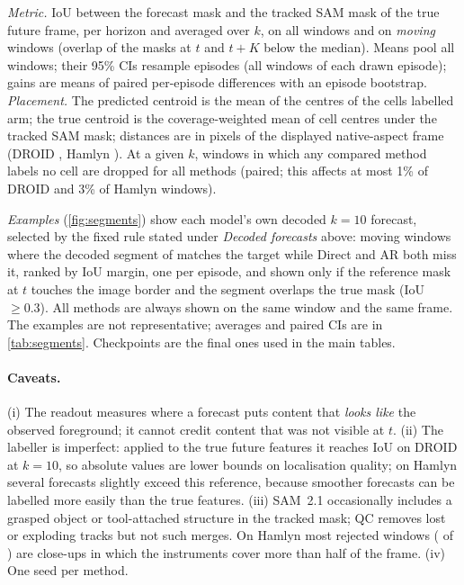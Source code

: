 \emph{Metric.} IoU between the forecast mask and the tracked SAM mask of the true future frame,
per horizon and averaged over $k$, on all windows and on \emph{moving} windows (overlap of the masks at $t$ and $t{+}K$
below the median). Means pool all windows; their 95\% CIs resample episodes (all windows of each drawn episode); gains are means of paired per-episode differences with an episode bootstrap.
\emph{Placement.} The predicted centroid is the mean of the centres of the cells labelled arm; the true centroid is
the coverage-weighted mean of cell centres under the tracked SAM mask; distances are in pixels of the displayed
native-aspect frame (DROID \segDroidPlaceFrame{}, Hamlyn \segHamlynPlaceFrame{}). At a given $k$, windows in which any compared method labels no cell are dropped for all methods (paired; this
affects at most 1\% of DROID and 3\% of Hamlyn windows).

\emph{Examples} (\cref{fig:segments}) show each model's own decoded
$k{=}10$ forecast, selected by the fixed rule stated under \emph{Decoded forecasts} above: moving windows where the decoded
segment of \ours{} matches the target while Direct and AR both miss it, ranked by IoU margin, one per episode, and shown
only if the reference mask at $t$ touches the image border and the \ours{} segment overlaps the true mask (IoU
$\ge 0.3$). All methods are always shown on the same window and the same frame. The examples are not representative; averages and paired CIs are in
\cref{tab:segments}. Checkpoints are the final ones used in the main tables.
\paragraph{Caveats.} (i) The readout measures where a forecast puts content that \emph{looks like} the observed
foreground; it cannot credit content that was not visible at $t$. (ii) The labeller is imperfect: applied to the true
future features it reaches IoU \segDroidOracleNn{} on DROID at $k{=}10$, so absolute values are lower bounds on
localisation quality; on Hamlyn several forecasts slightly exceed this reference, because smoother forecasts can be
labelled more easily than the true features. (iii) SAM~2.1 occasionally includes a grasped object or tool-attached
structure in the tracked mask; QC removes lost or exploding tracks but
not such merges. On Hamlyn most rejected windows (\segHamlynRejFgAreaAtT{} of \segHamlynRejected{}) are close-ups in which
the instruments cover more than half of the frame. (iv) One seed per method.

